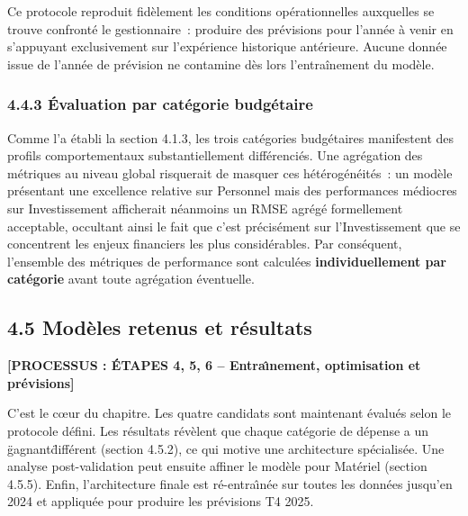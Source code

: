 \noindent
Ce protocole reproduit fid\`element les conditions op\'erationnelles auxquelles se trouve
confront\'e le gestionnaire~: produire des pr\'evisions pour l'ann\'ee \`a venir en
s'appuyant exclusivement sur l'exp\'erience historique ant\'erieure. Aucune donn\'ee
issue de l'ann\'ee de pr\'evision ne contamine d\`es lors l'entra\^inement du mod\`ele.

\subsubsection*{4.4.3 \quad \'Evaluation par cat\'egorie budg\'etaire}

Comme l'a \'etabli la section 4.1.3, les trois cat\'egories budg\'etaires manifestent des
profils comportementaux substantiellement diff\'erenci\'es. Une agr\'egation des m\'etriques
au niveau global risquerait de masquer ces h\'et\'erog\'en\'eit\'es~: un mod\`ele
pr\'esentant une excellence relative sur Personnel mais des performances m\'ediocres sur
Investissement afficherait n\'eanmoins un RMSE agr\'eg\'e formellement acceptable,
occultant ainsi le fait que c'est pr\'ecis\'ement sur l'Investissement que se concentrent
les enjeux financiers les plus consid\'erables. Par cons\'equent, l'ensemble des m\'etriques
de performance sont calcul\'ees \textbf{individuellement par cat\'egorie} avant toute
agr\'egation \'eventuelle.

\subsection*{4.5 \quad Mod\`eles retenus et r\'esultats}

\textbf{[PROCESSUS : \'ETAPES 4, 5, 6 -- Entra\^{\i}nement, optimisation et pr\'evisions]}

\noindent C'est le c\oe{}ur du chapitre. Les quatre candidats sont maintenant \'evalu\'es
selon le protocole d\'efini. Les r\'esultats r\'ev\`elent que chaque cat\'egorie de
d\'epense a un \"gagnant\" diff\'erent (section 4.5.2), ce qui motive une architecture
sp\'ecialis\'ee. Une analyse post-validation peut ensuite affiner le mod\`ele pour
Mat\'eriel (section 4.5.5). Enfin, l'architecture finale est r\'e-entra\^{\i}n\'ee
sur toutes les donn\'ees jusqu'en 2024 et appliqu\'ee pour produire les pr\'evisions
T4 2025.

